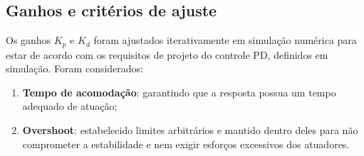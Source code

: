 \subsection{Ganhos e critérios de ajuste}
Os ganhos $K_p$ e $K_d$ foram ajustados iterativamente em simulação numérica para estar de acordo com os requisitos de projeto do controle PD, definidos em simulação.  
Foram considerados:
\begin{enumerate}[label=\roman*.]
    \item \textbf{Tempo de acomodação}:
    garantindo que a resposta possua um tempo adequado de atuação;
    \item \textbf{Overshoot}:
    estabelecido limites arbitrários e mantido dentro deles para não comprometer a estabilidade e nem exigir esforços excessivos dos atuadores.
\end{enumerate}
